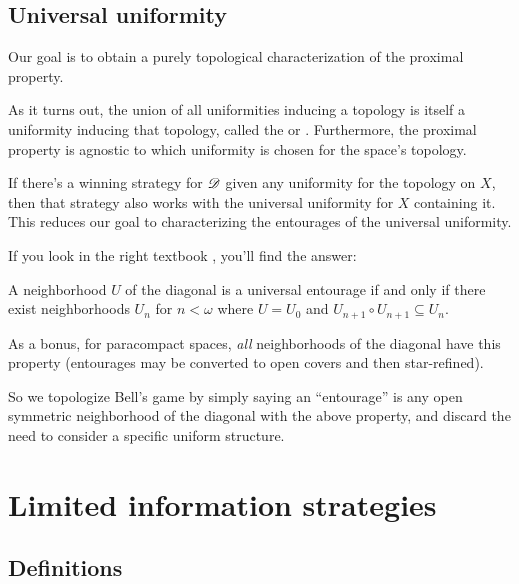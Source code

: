 \documentclass{beamer}
\theoremstyle{definition}
\begin{document}
\subsection{Universal uniformity}

\begin{frame}
  Our goal is to obtain a purely topological characterization of the
  proximal property.

  \vpause

  As it turns out, the union of all uniformities inducing a topology is
  itself a uniformity inducing that topology, called the
   or .
  Furthermore, the proximal property is agnostic to which uniformity
  is chosen for the space's topology.

  \vpause

  If there's a winning strategy for $\mathscr{D}$ given any uniformity for
  the topology on $X$, then
  that strategy also works with the universal uniformity for $X$
  containing it.
  This reduces our goal to characterizing the entourages of the
  universal uniformity.
\end{frame}

\begin{frame}
  If you look in the right textbook \cite{MR2048350}, you'll
  find the answer:

  \begin{theorem}
    A neighborhood $U$ of the diagonal is a universal entourage if
    and only if there
    exist neighborhoods $U_n$ for $n<\omega$ where $U=U_0$ and
    $U_{n+1}\circ U_{n+1}\subseteq U_n$.
  \end{theorem}

  \pause

  As a bonus, for paracompact spaces, \textit{all} neighborhoods of
  the diagonal have this property (entourages may be converted to open
  covers and then star-refined).

  \vpause

  So we topologize Bell's game by simply saying an ``entourage''
  is any open symmetric neighborhood of the diagonal with the above property,
  and discard the need to consider a specific uniform structure.
\end{frame}


\section{Limited information strategies}

\subsection{Definitions}
\end{document}
